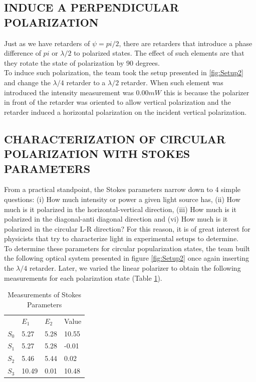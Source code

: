 \subsection{INDUCE A PERPENDICULAR POLARIZATION}
Just as we have retarders of $\psi = pi/2$, there are retarders that introduce a phase difference of $pi$ or $\lambda/2$ to polarized states. The effect of such elements are that they rotate the state of polarization by $90$ degrees. \\

To induce such polarization, the team took the setup presented in \ref{fig:Setup2} and change the $\lambda/4$  retarder to a $\lambda/2$ retarder. When such element was introduced the intensity measurement was $0.00 mW$ this is because the polarizer in front of the retarder was oriented to allow vertical polarization and the retarder induced a horizontal polarization on the incident vertical polarization.  


\subsection{CHARACTERIZATION OF CIRCULAR POLARIZATION WITH STOKES PARAMETERS}
From a practical standpoint, the Stokes parameters narrow down to 4 simple questions: (i) How much intensity or power a given light source has, (ii) How much is it polarized in the horizontal-vertical direction, (iii) How much is it polarized in the diagonal-anti diagonal direction and (vi) How much is it polarized in the circular L-R direction? For this reason, it is of great interest for physicists that try to characterize light in experimental setups to determine. \\

To determine these parameters for circular popularization states, the team built the following optical system presented in figure \ref{fig:Setup2} once again inserting the  $\lambda/4$ retarder. Later, we varied the linear polarizer to obtain the following measurements for each polarization state (Table \ref{Tab:Stokes}). \\

\begin{table}[H]
\begin{center}
\begin{tabular}{|l|l|l|l|}
      & $E_1$ & $E_2$ & Value \\
$S_0$ & 5.27  & 5.28  & 10.55  \\
$S_1$ & 5.27  & 5.28  & -0.01   \\
$S_2$ & 5.46  & 5.44  & 0.02     \\
$S_3$ & 10.49 & 0.01  & 10.48       
\end{tabular}
\caption{Measurements of Stokes Parameters}
\end{center}
\label{Tab:Stokes}
\end{table}

